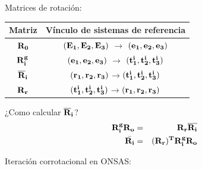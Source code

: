 \documentclass[
  aspectratio=169,
]{beamer}
\begin{document}
\begin{small}
\begin{frame}{Matrices de rotación:}{}
	\begin{minipage}[t]{0.5\linewidth}
		\begin{figure}[htbp]
			\centering
			\def\svgwidth{60mm}
			
		\end{figure}
	\end{minipage}\hfill
	\begin{minipage}[t]{0.5\linewidth}
		\begin{table}[htbp]
			\begin{tabular}{|c|c|}
				\hline
				Matriz & Vínculo de sistemas de referencia \\
				\hline \hline
				$\bf{R}_0$ &$(\bf{E_1},\bf{E_2},\bf{E_3})$ $\rightarrow$
				$(\bf{e_1},\bf{e_2},\bf{e_3})$   \\ \hline
				$\bf{R}_i^g$ & $(\bf{e_1},\bf{e_2},\bf{e_3})$ $\rightarrow$
				$(\bf{t_1^i},\bf{t_2^i},\bf{t_3^i})$ \\ \hline
				$\bf{\overline{R}}_i$ &
				$(\bf{r_1},\bf{r_2},\bf{r_3})$$\rightarrow$$(\bf{t_1^i},\bf{t_2^i},\bf{t_3^i})$
				\\ \hline
				$\bf{R}_r$ &
				$(\bf{t_1^i},\bf{t_2^i},\bf{t_3^i})$$\rightarrow$$(\bf{r_1},\bf{r_2},\bf{r_3})$ \\
				\hline
			\end{tabular}
		\end{table}
		\begin{block}{¿Como calcular $\bf{\overline{R}}_i$? }
			\begin{eqnarray}
			\bf{R_i^g}\bf{R_o}&=& \bf{R_r}\overline{\bf{R_i}}\\
			\bar{\bf{R_i}}&=&(\bf{R_r})^T\bf{R_i^g}\bf{R_o}
			\end{eqnarray}
		\end{block}
	\end{minipage}	
\end{frame}

\begin{frame}[t]{Iteración corrotacional en ONSAS:}
	\begin{columns}[T,onlytextwidth]
		\begin{column}{.4\textwidth}
			\begin{minipage}{\textwidth}
				\vfill
				\begin{figure}
					\centering
					\def\svgwidth{60mm}
					
				\end{figure}
			\end{minipage}  
			

\end{column}
\end{columns}
\end{frame}
\end{small}
\end{document}
